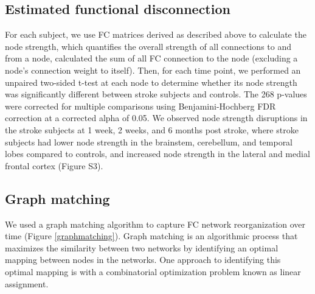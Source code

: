 \documentclass[phd,tocprelim]{cornell}
\begin{document}
	\subsection{Estimated functional disconnection}
	For each subject, we use FC matrices derived as described above to calculate the node strength, which quantifies the overall strength of all connections to and from a node, calculated the sum of all FC connection to the node (excluding a node's connection weight to itself). Then, for each time point, we performed an unpaired two-sided t-test at each node to determine whether its node strength was significantly different between stroke subjects and controls. The 268 p-values were corrected for multiple comparisons using Benjamini-Hochberg FDR correction at a corrected alpha of 0.05. We observed node strength disruptions in the stroke subjects at 1 week, 2 weeks, and 6 months post stroke, where stroke subjects had lower node strength in the brainstem, cerebellum, and temporal lobes compared to controls, and increased node strength in the lateral and medial frontal cortex (Figure S3).
	
	\subsection{Graph matching}
	We used a graph matching algorithm to capture FC network reorganization over time (Figure \ref{graphmatching}). Graph matching is an algorithmic process that maximizes the similarity between two networks by identifying an optimal mapping between nodes in the networks. One approach to identifying this optimal mapping is with a combinatorial optimization problem known as linear assignment. 
	
\end{document}
